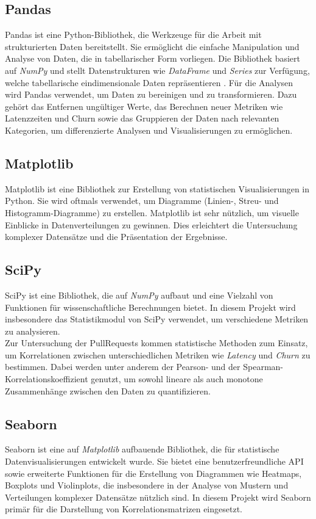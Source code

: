 \subsection{Pandas}
Pandas ist eine Python-Bibliothek, die Werkzeuge für die Arbeit mit strukturierten Daten bereitstellt. Sie ermöglicht die einfache Manipulation und Analyse von Daten, die in tabellarischer Form vorliegen. Die Bibliothek basiert auf \textit{NumPy} und stellt Datenstrukturen wie \textit{DataFrame} und \textit{Series} zur Verfügung, welche tabellarische eindimensionale Daten repräsentieren  \parencite{noauthor_pandas_nodate}. Für die Analysen wird Pandas verwendet, um Daten zu bereinigen und zu transformieren. Dazu gehört das Entfernen ungültiger Werte, das Berechnen neuer Metriken wie Latenzzeiten und Churn sowie das Gruppieren der Daten nach relevanten Kategorien, um differenzierte Analysen und Visualisierungen zu ermöglichen.

\subsection{Matplotlib}
Matplotlib ist eine Bibliothek zur Erstellung von statistischen Visualisierungen in Python. Sie wird oftmals verwendet, um Diagramme (Linien-, Streu- und Histogramm-Diagramme) zu erstellen. Matplotlib ist sehr nützlich, um visuelle Einblicke in Datenverteilungen zu gewinnen. Dies erleichtert die Untersuchung komplexer Datensätze und die Präsentation der Ergebnisse. \parencite{noauthor_matplotlib_nodate}

\subsection{SciPy}
SciPy ist eine Bibliothek, die auf \textit{NumPy} aufbaut und eine Vielzahl von Funktionen für wissenschaftliche Berechnungen bietet. In diesem Projekt wird insbesondere das Statistikmodul von SciPy verwendet, um verschiedene Metriken zu analysieren. \\
Zur Untersuchung der PullRequests kommen statistische Methoden zum Einsatz, um Korrelationen zwischen unterschiedlichen Metriken wie \textit{Latency} und \textit{Churn} zu bestimmen. Dabei werden unter anderem der Pearson- und der Spearman-Korrelationskoeffizient genutzt, um sowohl lineare als auch monotone Zusammenhänge zwischen den Daten zu quantifizieren. \parencite{noauthor_scipy_nodate}

\subsection{Seaborn}
Seaborn ist eine auf \textit{Matplotlib} aufbauende Bibliothek, die für statistische Datenvisualisierungen entwickelt wurde. Sie bietet eine benutzerfreundliche API sowie erweiterte Funktionen für die Erstellung von Diagrammen wie Heatmaps, Boxplots und Violinplots, die insbesondere in der Analyse von Mustern und Verteilungen komplexer Datensätze nützlich sind.
In diesem Projekt wird Seaborn primär für die Darstellung von Korrelationsmatrizen eingesetzt. \parencite{waskom_seaborn_2021}

